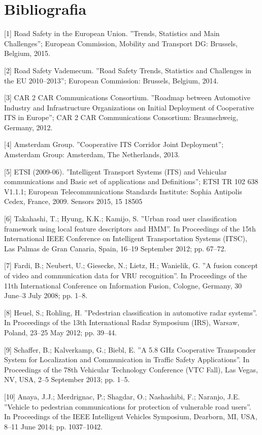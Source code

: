 \chapter{Bibliografia}
[1] Road Safety in the European Union. ''Trends, Statistics and Main Challenges''; European Commission, Mobility and Transport DG: Brussels, Belgium, 2015.

[2] Road Safety Vademecum. ''Road Safety Trends, Statistics and Challenges in the EU 2010–2013''; European Commission: Brussels, Belgium, 2014.

[3] CAR 2 CAR Communications Consortium. ''Roadmap between Automotive Industry and Infrastructure Organizations on Initial Deployment of Cooperative ITS in Europe''; CAR 2 CAR Communications Consortium: Braunschweig, Germany, 2012.

[4] Amsterdam Group. ''Cooperative ITS Corridor Joint Deployment''; Amsterdam Group: Amsterdam, The Netherlands, 2013.

[5] ETSI (2009-06). ''Intelligent Transport Systems (ITS) and Vehicular communications and Basic set of applications and Definitions''; ETSI TR 102 638 V1.1.1; European Telecommunications Standards Institute: Sophia Antipolis Cedex, France, 2009.
Sensors 2015, 15 18505

[6] Takahashi, T.; Hyung, K.K.; Kamijo, S. ''Urban road user classification framework using local feature descriptors and HMM''. In Proceedings of the 15th International IEEE Conference on Intelligent Transportation Systems (ITSC), Las Palmas de Gran Canaria, Spain, 16–19 September 2012; pp. 67–72.

[7] Fardi, B.; Neubert, U.; Giesecke, N.; Lietz, H.; Wanielik, G. ''A fusion concept of video and communication data for VRU recognition''. In Proceedings of the 11th International Conference on Information Fusion, Cologne, Germany, 30 June–3 July 2008; pp. 1–8.

[8] Heuel, S.; Rohling, H. ''Pedestrian classification in automotive radar systems''. In Proceedings of the 13th International Radar Symposium (IRS), Warsaw, Poland, 23–25 May 2012; pp. 39–44.

[9] Schaffer, B.; Kalverkamp, G.; Biebl, E. ''A 5.8 GHz Cooperative Transponder System for Localization and Communication in Traffic Safety Applications''. In Proceedings of the 78th Vehicular Technology Conference (VTC Fall), Las Vegas, NV, USA, 2–5 September 2013; pp. 1–5.

[10] Anaya, J.J.; Merdrignac, P.; Shagdar, O.; Nashashibi, F.; Naranjo, J.E. ''Vehicle to pedestrian communications for protection of vulnerable road users''. In Proceedings of the IEEE Intelligent Vehicles Symposium, Dearborn, MI, USA, 8–11 June 2014; pp. 1037–1042.

